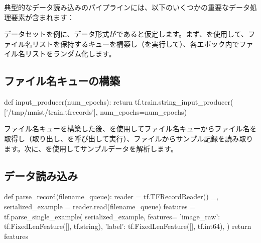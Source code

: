 \begin{content}

典型的なデータ読み込みのパイプラインには、以下のいくつかの重要なデータ処理要素が含まれます：

\begin{enum}
\end{enum}

データセットを例に、データ形式がであると仮定します。まず、を使用して、ファイル名リストを保持するキューを構築し（を実行して）、各エポック内でファイル名リストをランダム化します。

\subsection{ファイル名キューの構築}


\begin{leftbar}
\begin{python}
def input_producer(num_epochs):
  return tf.train.string_input_producer(
    ['/tmp/mnist/train.tfrecords'], num_epochs=num_epochs)
\end{python}
\end{leftbar}

ファイル名キューを構築した後、を使用してファイル名キューからファイル名を取得し（取り出し、を呼び出して実行）、ファイルからサンプル記録を読み取ります。次に、を使用してサンプルデータを解析します。

\subsection{データ読み込み}

\begin{leftbar}
\begin{python}
def parse_record(filename_queue):
  reader = tf.TFRecordReader()
  _, serialized_example = reader.read(filename_queue)
  features = tf.parse_single_example(
      serialized_example,
      features={
          'image_raw': tf.FixedLenFeature([], tf.string),
          'label': tf.FixedLenFeature([], tf.int64),
      })
  return features
\end{python}
\end{leftbar}


\end{content}
